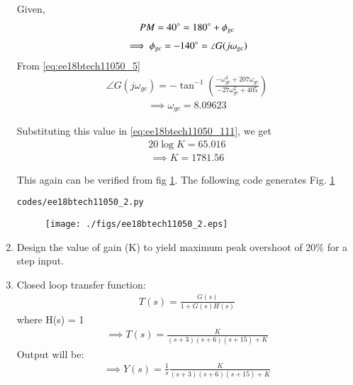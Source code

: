 \begin{enumerate}[label=\thesection.\arabic*.,ref=\thesection.\theenumi]
Given,
\begin{align}
    PM = 40\degree = 180\degree + \phi_{gc}
    \label{eq:ee18btech11050_8}
\end{align}
\begin{align}
    \implies \phi_{gc} = -140\degree = \angle{G(j\omega_{gc})}
\end{align}
From \eqref{eq:ee18btech11050_5} 
\begin{align}
    \angle{G(j\omega_{gc})} = -\tan^{-1}(\frac{-\omega_{gc}^3+207\omega_{gc}}{-27\omega_{gc}^2+405})
    \label{eq:ee18btech11050_9}
\end{align}
\begin{align}
    \implies \omega_{gc} = 8.09623
    \label{eq:ee18btech11050_10}
\end{align}

Substituting this value in \eqref{eq:ee18btech11050_111}, we get
\begin{align}
    20\log{K} = 65.016
\end{align}
\begin{align}
    \implies K = 1781.56
    \label{eq:ee18btech11050_12}
\end{align}

This again can be verified from fig \ref{fig:ee18btech11050_fig3}.
The following code generates Fig. \ref{fig:ee18btech11050_fig3}
\begin{lstlisting}
codes/ee18btech11050_2.py
\end{lstlisting}
\begin{figure}[!ht]
\centering
\texttt{[image: ./figs/ee18btech11050\_2.eps]}
\caption{}
\label{fig:ee18btech11050_fig3}
\end{figure}

\item Design the value of gain (K) to yield maximum peak overshoot of 20\% for a step input.

\item \solution
Closed loop transfer function:
\begin{align}
    T(s) = \frac{G(s)}{1+G(s)H(s)}
\end{align}
where H(s) = 1
\begin{align}
    \implies T(s) = \frac{K}{(s+3)(s+6)(s+15)+K}
    \label{eq:ee18btech11050_13}
\end{align}
Output will be:
\begin{align}
    \implies Y(s) = \frac{1}{s}\frac{K}{(s+3)(s+6)(s+15)+K}
    \label{eq:ee18btech11050_14}
\end{align}


\end{enumerate}
